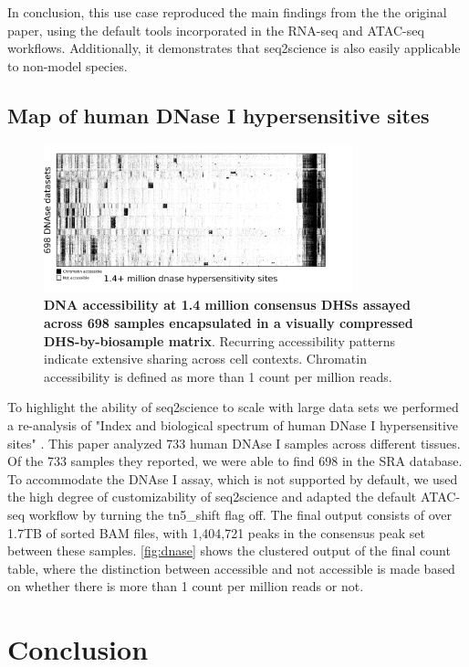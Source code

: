 In conclusion, this use case reproduced the main findings from the the original paper, using the default tools incorporated in the RNA-seq and ATAC-seq workflows. Additionally, it demonstrates that seq2science is also easily applicable to non-model species.

\subsection{Map of human DNase I hypersensitive sites}

\begin{figure}
	\centering
	\includegraphics[width=0.8\textwidth]{ch.seq2science/imgs/dnase.png}
	\caption{\label{fig:dnase} \textbf{DNA accessibility at 1.4 million consensus DHSs assayed across 698 samples encapsulated in a visually compressed DHS-by-biosample matrix}. Recurring accessibility patterns indicate extensive sharing across cell contexts. Chromatin accessibility is defined as more than 1 count per million reads. }
\end{figure}

To highlight the ability of seq2science to scale with large data sets we performed a re-analysis of "Index and biological spectrum of human DNase I hypersensitive sites" \cite{Meuleman2020}. This paper analyzed 733 human DNAse I samples across different tissues. Of the 733 samples they reported, we were able to find 698 in the SRA database. To accommodate the DNAse I assay, which is not supported by default, we used the high degree of customizability of seq2science and adapted the default ATAC-seq workflow by turning the tn5\_shift flag off. The final output consists of over 1.7TB of sorted BAM files, with 1,404,721 peaks in the consensus peak set between these samples. \autoref{fig:dnase} shows the clustered output of the final count table, where the distinction between accessible and not accessible is made based on whether there is more than 1 count per million reads or not.

\section{Conclusion}

